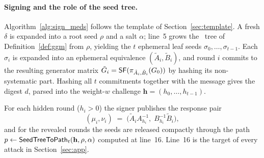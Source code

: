 \paragraph{Signing and the role of the seed tree.}
Algorithm~\ref{alg:sign_meds} follows the template of
Section~\ref{sec:template}. A fresh $\delta$ is expanded into a root seed
$\rho$ and a salt $\alpha$; line~5 grows the \GGM\ tree of
Definition~\ref{def:ggm} from $\rho$, yielding the $t$ ephemeral leaf seeds
$\sigma_0,\ldots,\sigma_{t-1}$. Each $\sigma_i$ is expanded into an ephemeral
equivalence $(\tilde{A}_i, \tilde{B}_i)$, and round $i$ commits to the
resulting generator matrix
$\tilde{G}_i = \mathsf{SF}(\pi_{\tilde{A}_i,\tilde{B}_i}(G_0))$ by hashing its
non-systematic part. Hashing all $t$ commitments together with the message
gives the digest $d$, parsed into the weight-$w$ challenge
$\mathbf{h} = (h_0,\ldots,h_{t-1})$.

For each hidden round ($h_i > 0$) the signer publishes the response pair
\begin{equation}
  \label{eq:meds-resp}
  (\mu_i, \nu_i) \;=\; \bigl(\tilde{A}_i A_{h_i}^{-1},\;
                             B_{h_i}^{-1} \tilde{B}_i\bigr),
\end{equation}
and for the revealed rounds the seeds are released compactly through the path
$p \leftarrow \mathsf{SeedTreeToPath}_t(\mathbf{h},\rho,\alpha)$ computed at line~16.
Line~16 is the target of every attack in Section~\ref{sec:app}.

